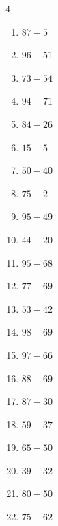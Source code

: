 \begin{multicols}{4}
\begin{enumerate}
  \item $87-5$
        \phantom{$=82$}

  \item $96-51$
        \phantom{$=45$}

  \item $73-54$
        \phantom{$=19$}

  \item $94-71$
        \phantom{$=23$}

  \item $84-26$
        \phantom{$=58$}

  \item $15-5$
        \phantom{$=10$}

  \item $50-40$
        \phantom{$=10$}

  \item $75-2$
        \phantom{$=73$}

\columnbreak %

  \item $95-49$
        \phantom{$=46$}

  \item $44-20$
        \phantom{$=24$}

  \item $95-68$
        \phantom{$=27$}

  \item $77-69$
        \phantom{$=8$}

  \item $53-42$
        \phantom{$=11$}

  \item $98-69$
        \phantom{$=29$}

  \item $97-66$
        \phantom{$=31$}

  \item $88-69$
        \phantom{$=19$}

  \item $87-30$
        \phantom{$=57$}

  \item $59-37$
        \phantom{$=22$}

  \item $65-50$
        \phantom{$=15$}

  \item $39-32$
        \phantom{$=7$}

  \item $80-50$
        \phantom{$=30$}

  \item $75-62$
        \phantom{$=13$}


\end{enumerate}
\end{multicols}
